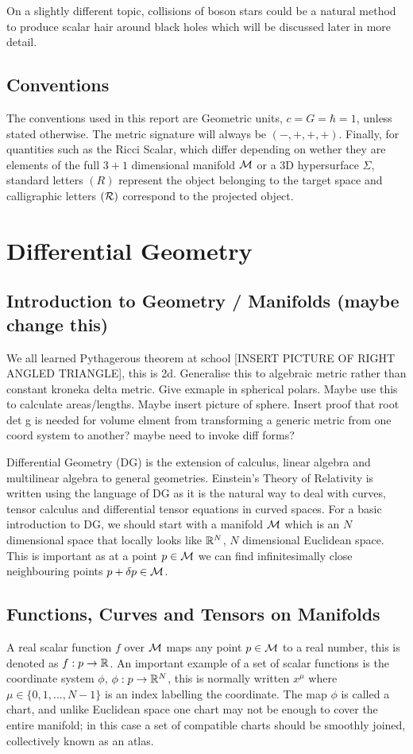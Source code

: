 On a slightly different topic, collisions of boson stars could be a natural method to produce scalar hair around black holes which will be discussed later in more detail. 

\subsection{Conventions}
The conventions used in this report are Geometric units, $c=G=\hbar=1$, unless stated otherwise. The metric signature will always be $(-,+,+,+)$. Finally, for quantities such as the Ricci Scalar, which differ depending on wether they are elements of the full $3+1$ dimensional manifold $\mathcal{M}$ or a $3$D hypersurface $\Sigma$, standard letters $(R)$ represent the object belonging to the target space and calligraphic letters $(\mathcal{R})$ correspond to the projected object.




\section{Differential Geometry}
\subsection{Introduction to Geometry / Manifolds (maybe change this)}
We all learned Pythagerous theorem at school [INSERT PICTURE OF RIGHT ANGLED TRIANGLE], this is 2d. Generalise this to algebraic metric rather than constant kroneka delta metric. Give exmaple in spherical polars. Maybe use this to calculate areas/lengths. Maybe insert picture of sphere. Insert proof that root det g is needed for volume elment from transforming a generic metric from one coord system to another? maybe need to invoke diff forms?

Differential Geometry (DG) is the extension of calculus, linear algebra and multilinear algebra to general
geometries. Einstein’s Theory of Relativity is written using the language of DG as it is the natural
way to deal with curves, tensor calculus and differential tensor equations in curved spaces. For a basic
introduction to DG, we should start with a manifold $\mathcal{M}$ which is an $N$ dimensional space that locally looks
like $\mathbb{R}^N$, $N$ dimensional Euclidean space. This is important as at a point $p\in\mathcal{M}$ we can find infinitesimally
close neighbouring points $p + \delta p \in \mathcal{M}$. 

\subsection{Functions, Curves and Tensors on Manifolds}
A real scalar function $f$ over $\mathcal{M}$ maps any point $p\in \mathcal{M}$ to a real number, this is denoted as
$f : p \rightarrow \mathbb{R}$. An important example of a set of scalar functions is the coordinate system $\phi$, $\phi : p \rightarrow \mathbb{R}^N$,
this is normally written $x^\mu$ where $\mu\in\{0,1,...,N-1\}$ is an index labelling the coordinate. The map $\phi$ is called a chart,
and unlike Euclidean space one chart may not be enough to cover the entire manifold; in this case a set
of compatible charts should be smoothly joined, collectively known as an atlas.

